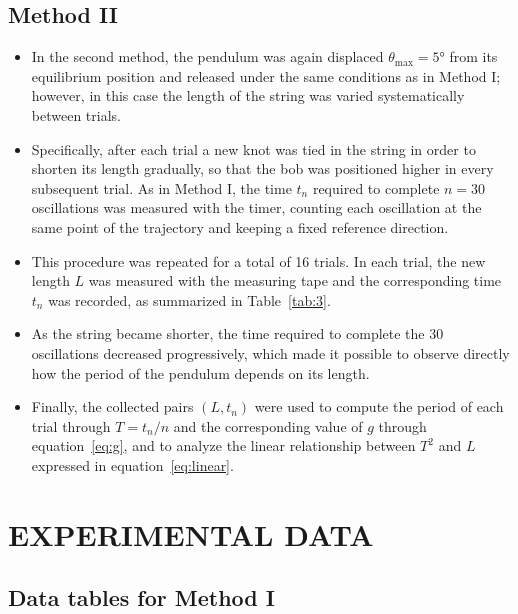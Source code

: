 \documentclass[11pt,a4paper]{article}
\begin{document}
\subsection*{Method II}
\begin{itemize}
  \item In the second method, the pendulum was again displaced
        $\theta_{\max} = \ang{5}$ from its equilibrium position and released
        under the same conditions as in Method I; however, in this case the
        length of the string was varied systematically between trials.
  \item Specifically, after each trial a new knot was tied in the string in
        order to shorten its length gradually, so that the bob was positioned
        higher in every subsequent trial. As in Method I, the time $t_n$
        required to complete $n = 30$ oscillations was measured with the
        timer, counting each oscillation at the same point of the trajectory
        and keeping a fixed reference direction.
  \item This procedure was repeated for a total of 16 trials. In each trial,
        the new length $L$ was measured with the measuring tape and the
        corresponding time $t_n$ was recorded, as summarized in
        Table~\ref{tab:3}.
  \item As the string became shorter, the time required to complete the 30
        oscillations decreased progressively, which made it possible to
        observe directly how the period of the pendulum depends on its
        length.
  \item Finally, the collected pairs $(L, t_n)$ were used to compute the
        period of each trial through $T = t_n/n$ and the corresponding value
        of $g$ through equation~\eqref{eq:g}, and to analyze the linear
        relationship between $T^{2}$ and $L$ expressed in
        equation~\eqref{eq:linear}.
\end{itemize}

\section{EXPERIMENTAL DATA}

\subsection{Data tables for Method I}
\end{document}
